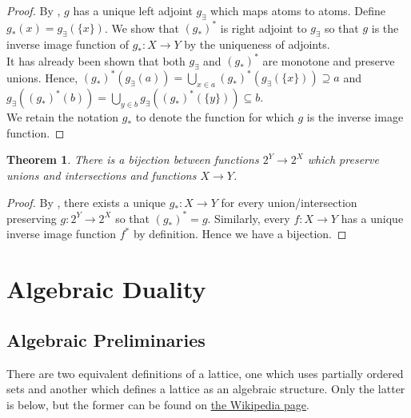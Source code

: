 \documentclass{article}
\newtheorem{theorem}[proposition]{Theorem}
\numberwithin{equation}{section}
\begin{document}
\begin{proof}
By , $g$ has a unique left adjoint $g_\exists$ which maps atoms to atoms. Define $g_*(x) = g_\exists(\{x\})$. We show that $(g_*)^*$ is right adjoint to $g_\exists$ so that $g$ is the inverse image function of $g_* : X \to Y$ by the uniqueness of adjoints. \\

It has already been shown that both $g_\exists$ and $(g_*)^*$ are monotone and preserve unions. Hence, $(g_*)^*(g_\exists(a)) = \bigcup_{x \in a} (g_*)^*(g_\exists(\{x\})) \supseteq a$ and $g_\exists((g_*)^*(b)) = \bigcup_{y \in b} g_\exists((g_*)^*(\{y\})) \subseteq b$. \\

We retain the notation $g_*$ to denote the function for which $g$ is the inverse image function. 
\end{proof}

\begin{theorem} \label{thm:bijection-set-morphisms-to-powset-morphisms}
There is a bijection between functions $2^Y \to 2^X$ which preserve unions and intersections and functions $X \to Y$.
\end{theorem}

\begin{proof}
By , there exists a unique $g_* : X \to Y$ for every union/intersection preserving $g : 2^Y \to 2^X$ so that $(g_*)^* = g$. Similarly, every $f : X \to Y$ has a unique inverse image function $f^*$ by definition. Hence we have a bijection.
\end{proof}

\pagebreak


\section{Algebraic Duality}

\subsection{Algebraic Preliminaries}

There are two equivalent definitions of a lattice, one which uses partially ordered sets and another which defines a lattice as an algebraic structure. Only the latter is below, but the former can be found on \href{https://en.wikipedia.org/wiki/Lattice_(order)}{the Wikipedia page}.
\end{document}

